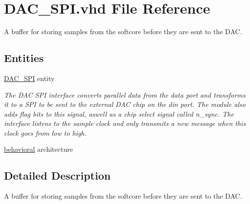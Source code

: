 \hypertarget{DAC__SPI_8vhd}{\section{D\-A\-C\-\_\-\-S\-P\-I.\-vhd File Reference}
\label{DAC__SPI_8vhd}
}


A buffer for storing samples from the softcore before they are sent to the D\-A\-C.  


\subsection*{Entities}
\begin{DoxyCompactItemize}
\item 
\hyperlink{classDAC__SPI}{D\-A\-C\-\_\-\-S\-P\-I} entity
\begin{DoxyCompactList}\small\item\em The D\-A\-C S\-P\-I interface converts parallel data from the data port and transforms it to a S\-P\-I to be sent to the external D\-A\-C chip on the din port. The module also adds flag bits to this signal, aswell as a chip select signal called n\-\_\-sync. The interface listens to the sample clock and only transmits a new message when this clock goes from low to high. \end{DoxyCompactList}\item 
\hyperlink{classDAC__SPI_1_1behavioral}{behavioral} architecture
\end{DoxyCompactItemize}


\subsection{Detailed Description}
A buffer for storing samples from the softcore before they are sent to the D\-A\-C. 